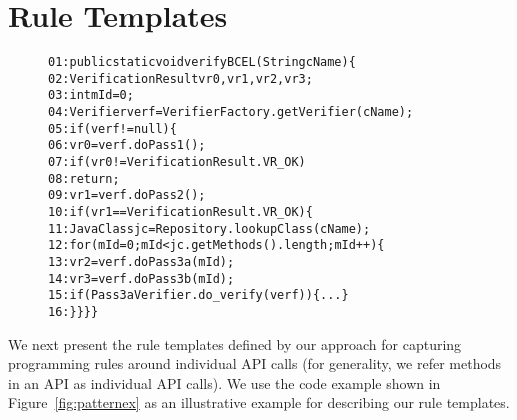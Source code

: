\section{Rule Templates}
\label{sec:ruletmpl}

\begin{figure}[t]
\begin{CodeOut}
\begin{alltt}
01:public static void verifyBCEL(String cName) \{ 
02:\hspace*{0.1in}VerificationResult vr0, vr1, vr2, vr3; 
03:\hspace*{0.1in}int mId = 0;
04:\hspace*{0.1in}Verifier verf = VerifierFactory.getVerifier(cName);
05:\hspace*{0.1in}if(verf != null) \{ 	
06:\hspace*{0.2in}vr0 = verf.doPass1();
07:\hspace*{0.2in}if(vr0 != VerificationResult.VR\_OK)
08:\hspace*{0.4in}return;
09:\hspace*{0.2in}vr1 = verf.doPass2();	
10:\hspace*{0.2in}if (vr1 == VerificationResult.VR\_OK) \{ 
11:\hspace*{0.4in}JavaClass jc = Repository.lookupClass(cName);
12:\hspace*{0.4in}for(mId=0; mId<jc.getMethods().length; mId++)\{ 
13:\hspace*{0.5in}vr2 = verf.doPass3a(mId);
14:\hspace*{0.5in}vr3 = verf.doPass3b(mId);
15:\hspace*{0.5in}if(Pass3aVerifier.do\_verify(verf)) \{ ... \}
16:\hspace*{0.1in}\} \hspace*{0.2in}\} \hspace*{0.1in}\} \} 
\end{alltt}
\end{CodeOut}\vspace{-5ex}
\vspace{-4ex}
\end{figure}

We next present the rule templates defined by our approach for
capturing programming rules around individual API calls (for generality,
we refer methods in an API as individual API calls). We use the code example
shown in Figure~\ref{fig:patternex} as an illustrative example for
describing our rule templates. 

